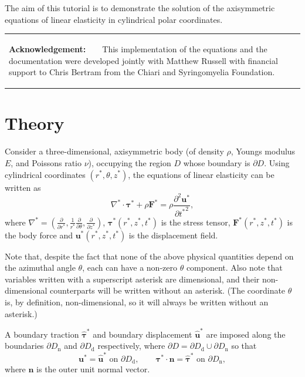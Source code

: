 The aim of this tutorial is to demonstrate the solution of the axisymmetric equations of linear elasticity in cylindrical polar coordinates.

\begin{center} \tabulinesep=1mm
\begin{longtabu} spread 0pt [c]{*{1}{|X[-1]}|}
\hline
\begin{center} {\bfseries Acknowledgement\+:} ~\newline
~\newline
This implementation of the equations and the documentation were developed jointly with Matthew Russell with financial support to Chris Bertram from the Chiari and Syringomyelia Foundation. \end{center}    \\
\end{longtabu}
\end{center} 



 

\hypertarget{index_theory}{}\section{Theory}\label{index_theory}
Consider a three-\/dimensional, axisymmetric body (of density $ \rho $, Young\textquotesingle{}s modulus $ E $, and Poisson\textquotesingle{}s ratio $ \nu $), occupying the region $ D $ whose boundary is $ \partial D $. Using cylindrical coordinates $ (r^*,\theta,z^*) $, the equations of linear elasticity can be written as \[ \nabla^* \cdot \bm{\tau}^* + \rho \mathbf{F}^* = \rho\frac{\partial^2\mathbf{u}^*} {\partial {t^*}^2}, \] where $\nabla^* = \left(\frac{\partial}{\partial r^*}, \frac{1}{r^*}\frac{\partial} {\partial \theta},\frac{\partial}{\partial z^*}\right)$, $ \bm{\tau}^*(r^*,z^*,t^*) $ is the stress tensor, $\mathbf{F}^*(r^*,z^*,t^*)$ is the body force and $ \mathbf{u^*}(r^*,z^*,t^*) $ is the displacement field.

Note that, despite the fact that none of the above physical quantities depend on the azimuthal angle $ \theta $, each can have a non-\/zero $ \theta $ component. Also note that variables written with a superscript asterisk are dimensional, and their non-\/dimensional counterparts will be written without an asterisk. (The coordinate $ \theta $ is, by definition, non-\/dimensional, so it will always be written without an asterisk.)

A boundary traction $ \hat{\bm{\tau}}^* $ and boundary displacement $ \hat{\mathbf{u}}^* $ are imposed along the boundaries $ \partial D_\mathrm{n} $ and $ \partial D_\mathrm{d} $ respectively, where $ \partial D = \partial D_\mathrm{d} \cup \partial D_\mathrm{n} $ so that \[ \mathbf{u}^* = \hat{\mathbf{u}}^*\text{ on }\partial D_\mathrm{d}, \qquad \bm{\tau}^*\cdot\mathbf{n} = \hat{\bm{\tau}}^*\text{ on }\partial D_\mathrm{n}, \] where $ \mathbf{n} $ is the outer unit normal vector.

